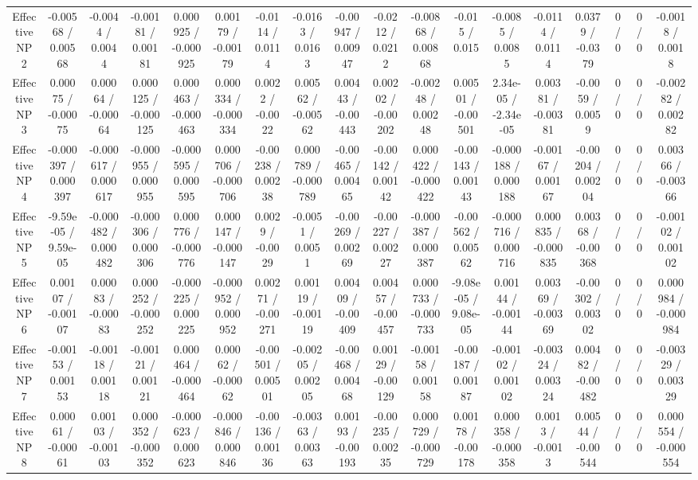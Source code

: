 \documentclass[10pt]{article}
\begin{document}
\begin{table}[htbp]
\begin{center}
\begin{tabular}{|c|c|c|c|c|c|c|c|c|c|c|c|c|c|c|c|c|c|}
  Effective NP 2 & -0.00568 / 0.00568 & -0.0044 / 0.0044 & -0.00181 / 0.00181 & 0.000925 / -0.000925 & 0.00179 / -0.00179 & -0.0114 / 0.0114 & -0.0163 / 0.0163 & -0.00947 / 0.00947 & -0.0212 / 0.0212 & -0.00868 / 0.00868 & -0.015 / 0.015 & -0.0085 / 0.0085 & -0.0114 / 0.0114 & 0.0379 / -0.0379 & 0 / 0 & 0 / 0 & -0.0018 / 0.0018 \\ 
  Effective NP 3 & 0.00075 / -0.00075 & 0.00064 / -0.00064 & 0.000125 / -0.000125 & 0.000463 / -0.000463 & 0.000334 / -0.000334 & 0.0022 / -0.0022 & 0.00562 / -0.00562 & 0.00443 / -0.00443 & 0.00202 / -0.00202 & -0.00248 / 0.00248 & 0.00501 / -0.00501 & 2.34e-05 / -2.34e-05 & 0.00381 / -0.00381 & -0.0059 / 0.0059 & 0 / 0 & 0 / 0 & -0.00282 / 0.00282 \\ 
  Effective NP 4 & -0.000397 / 0.000397 & -0.000617 / 0.000617 & -0.000955 / 0.000955 & -0.000595 / 0.000595 & 0.000706 / -0.000706 & -0.00238 / 0.00238 & 0.000789 / -0.000789 & -0.00465 / 0.00465 & -0.00142 / 0.00142 & 0.000422 / -0.000422 & -0.00143 / 0.00143 & -0.000188 / 0.000188 & -0.00167 / 0.00167 & -0.00204 / 0.00204 & 0 / 0 & 0 / 0 & 0.00366 / -0.00366 \\ 
  Effective NP 5 & -9.59e-05 / 9.59e-05 & -0.000482 / 0.000482 & -0.000306 / 0.000306 & 0.000776 / -0.000776 & 0.000147 / -0.000147 & 0.0029 / -0.0029 & -0.0051 / 0.0051 & -0.00269 / 0.00269 & -0.00227 / 0.00227 & -0.000387 / 0.000387 & -0.00562 / 0.00562 & -0.000716 / 0.000716 & 0.000835 / -0.000835 & 0.00368 / -0.00368 & 0 / 0 & 0 / 0 & -0.00102 / 0.00102 \\ 
  Effective NP 6 & 0.00107 / -0.00107 & 0.00083 / -0.00083 & 0.000252 / -0.000252 & -0.000225 / 0.000225 & -0.000952 / 0.000952 & 0.00271 / -0.00271 & 0.00119 / -0.00119 & 0.00409 / -0.00409 & 0.00457 / -0.00457 & 0.000733 / -0.000733 & -9.08e-05 / 9.08e-05 & 0.00144 / -0.00144 & 0.00369 / -0.00369 & -0.00302 / 0.00302 & 0 / 0 & 0 / 0 & 0.000984 / -0.000984 \\ 
  Effective NP 7 & -0.00153 / 0.00153 & -0.00118 / 0.00118 & -0.00121 / 0.00121 & 0.000464 / -0.000464 & 0.00062 / -0.00062 & -0.00501 / 0.00501 & -0.00205 / 0.00205 & -0.00468 / 0.00468 & 0.00129 / -0.00129 & -0.00158 / 0.00158 & -0.00187 / 0.00187 & -0.00102 / 0.00102 & -0.00324 / 0.00324 & 0.00482 / -0.00482 & 0 / 0 & 0 / 0 & -0.00329 / 0.00329 \\ 
  Effective NP 8 & 0.00061 / -0.00061 & 0.00103 / -0.00103 & 0.000352 / -0.000352 & -0.000623 / 0.000623 & -0.000846 / 0.000846 & -0.00136 / 0.00136 & -0.00363 / 0.00363 & 0.00193 / -0.00193 & -0.00235 / 0.00235 & 0.000729 / -0.000729 & 0.00178 / -0.00178 & 0.000358 / -0.000358 & 0.0013 / -0.0013 & 0.00544 / -0.00544 & 0 / 0 & 0 / 0 & 0.000554 / -0.000554 \\ 

\end{tabular}
\end{center}
\end{table}
\end{document}

